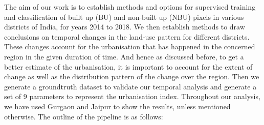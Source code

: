The aim of our work is to establish methods and options for supervised training and classification of built up (BU) and non-built up (NBU) pixels in various districts of India, for years 2014 to 2018. We then establish methods to draw conclusions on temporal changes in the land-use pattern for different districts. These changes account for the urbanisation that has happened in the concerned region in the given duration of time. And hence as discussed before, to get a better estimate of the urbanisation, it is important to account for the extent of change as well as the distribution pattern of the change over the region. Then we generate a groundtruth dataset to validate our temporal analysis and generate a set of 9 parameters to represent the urbanisation index. Throughout our analysis, we have used Gurgaon and Jaipur to show the results, unless mentioned otherwise. The outline of the pipeline is as follows:

